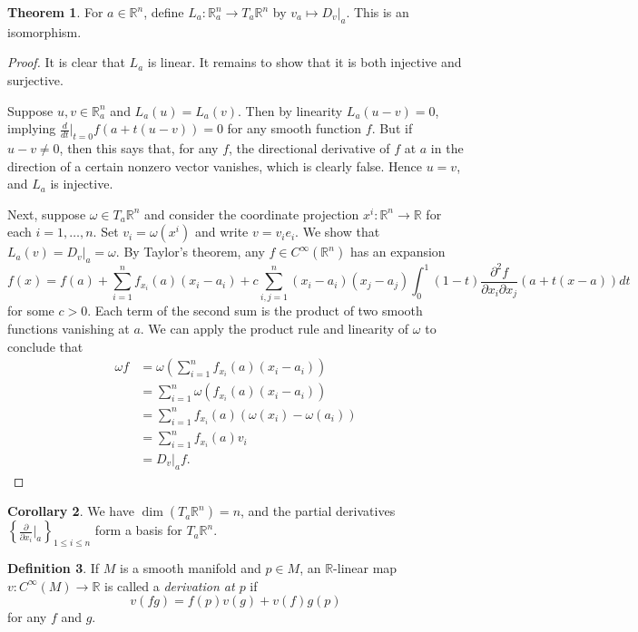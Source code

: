 \documentclass[10pt,letterpaper,cm]{nupset}
\theoremstyle{definition}
\newtheorem{definition}{Definition}[subsection]
\theoremstyle{theorem}
\newtheorem{theorem}[definition]{Theorem}
\newtheorem{corollary}[definition]{Corollary}
\theoremstyle{remark}
\newcommand{\R}{\mathbb R}
\newcommand{\1}{\mathbf{1}}
\newcommand{\0}{\vec 0}
\begin{document}
\begin{theorem}
For $a \in \R^n$, define $L_a : \R_a^n \to T_a\R^n$ by $v_a \mapsto D_v\bigr\rvert_a$. This is an isomorphism. 
\end{theorem}
\begin{proof}
It is clear that $L_a$ is linear. It remains to show that it is both injective and surjective. 

\medskip


Suppose $u, v \in \R_a^n$ and $L_a(u) = L_a(v)$. Then by linearity $L_a(u-v) = 0$, implying $\frac{d}{d{t}}\bigr\rvert_{t=0} f(a + t(u-v)) = 0$ for any smooth function $f$. But if $u-v \ne 0$, then this says that, for any $f$, the directional derivative of $f$ at $a$ in the direction of a certain nonzero vector vanishes, which is clearly false. Hence $u=v$, and $L_a$ is injective. 

\medskip


Next, suppose $\omega \in T_a\R^n$ and consider the coordinate projection $x^i : \R^n \to \R$ for each $i=1, \ldots, n$. Set $v_i = \omega(x^i)$ and write $v= v_ie_i$. We show that $L_a(v) = D_v\bigr\rvert_a = \omega$. By Taylor's theorem, any $f\in C^{\infty}(\R^n)$ has an expansion $$f(x) = f(a) + \sum_{i=1}^n f_{x_i}(a)(x_i-a_i) + c\sum_{i, j=1}^n(x_i - a_i)(x_j-a_j) \int_{0}^1(1-t) \frac{\partial^2{f}}{\partial{x_i}\partial{x_j}}\left(a+t(x-a)\right)dt$$ for some $c >0$. Each term of the second sum is the product of two smooth functions vanishing at $a$. We can apply the product rule and linearity of $\omega$ to conclude that 
\begin{align*}
\omega f & = \omega \left(\sum_{i=1}^n f_{x_i}(a)(x_i-a_i)\right) 
\\ & =\sum_{i=1}^n \omega(f_{x_i}(a)(x_i -a_i)) 
\\ & = \sum_{i=1}^n f_{x_i}(a)( \omega(x_i) -\omega(a_i))
\\ & = \sum_{i=1}^n f_{x_i}(a)v_i 
\\ & =  D_v\bigr\rvert_a f.
\end{align*}
\end{proof}

\begin{corollary}
We have $\dim(T_a\R^n) = n$, and the partial derivatives $\left\{\frac{\partial}{\partial{x_i}}\bigr\rvert_a\right\}_{1\leq i \leq n}$ form a basis for $T_a\R^n$. 
\end{corollary}

\begin{definition}
If $M$ is a smooth manifold and $p\in M$, an $\R$-linear map $v: C^{\infty}(M) \to \R$ is called a \textit{derivation at $p$} if $$v(fg) = f(p)v(g) + v(f)g(p)$$ for any $f$ and $g$.
\end{definition}
\end{document}
